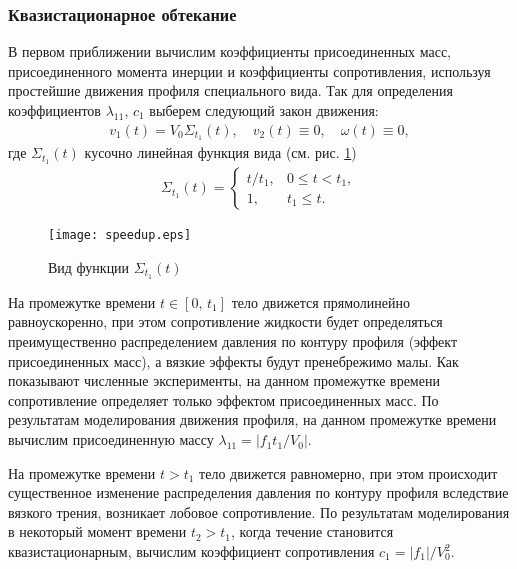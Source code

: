 \subsubsection*{Квазистационарное обтекание}

В первом приближении вычислим коэффициенты присоединенных масс, присоединенного момента инерции и коэффициенты сопротивления, используя простейшие движения профиля специального вида. Так для определения коэффициентов $\lambda_{11}$, $c_1$ выберем следующий закон движения:
\begin{gather}
	v_1(t) = V_0 \Sigma_{t_1}(t),\quad v_2(t) \equiv 0,\quad \omega(t) \equiv 0,
\end{gather}
где $\Sigma_{t_1}(t)$ кусочно линейная функция вида (см. рис. \ref{fig.sigma})
\begin{gather}
	\Sigma_{t_1}(t) = \begin{cases}
		t / t_1, & 0 \leqslant t < t_1,\\
		1, & t_1 \leqslant t.
	\end{cases}
\end{gather}

\begin{figure}[ht!]
	\centering
	\texttt{[image: speedup.eps]}
	\caption{Вид функции $\Sigma_{t_1}(t)$}\label{fig.sigma}
\end{figure}

На промежутке времени $t \in [0,\, t_1]$ тело движется прямолинейно равноускоренно, при этом сопротивление жидкости будет определяться преимущественно распределением давления по контуру профиля (эффект присоединенных масс), а вязкие эффекты будут пренебрежимо малы. Как показывают численные эксперименты, на данном промежутке времени сопротивление определяет только эффектом присоединенных масс. По результатам моделирования движения профиля, на данном промежутке времени вычислим присоединенную массу $\lambda_{11} = |f_1 t_1 / V_0|$.

На промежутке времени $t > t_1$ тело движется равномерно, при этом происходит существенное изменение распределения давления по контуру профиля вследствие вязкого трения, возникает лобовое сопротивление. По результатам моделирования в некоторый момент времени $t_2 > t_1$, когда течение становится квазистационарным, вычислим коэффициент сопротивления $c_1 = |f_1| / V_0^2$.

